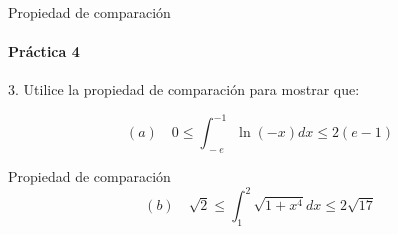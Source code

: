 \documentclass{plantillaPPT}
\begin{document}
\begin{frame}{Propiedad de comparación}
    \framesubtitle{Práctica 4}
    \vspace{-1.5cm}
    
3. Utilice la propiedad de comparación para mostrar que: 
\vspace{1cm}

\[(a) \quad 0 \leq \int_{\, -e}^{-1} \ln(-x)dx \leq 2(e-1)\]
    
\end{frame}

\begin{frame}{Propiedad de comparación}
\[(b) \quad \sqrt{2} \leq \int_{1}^{2}\sqrt{1+x^4}dx \leq 2\sqrt{17}\]
\end{frame}
\end{document}
